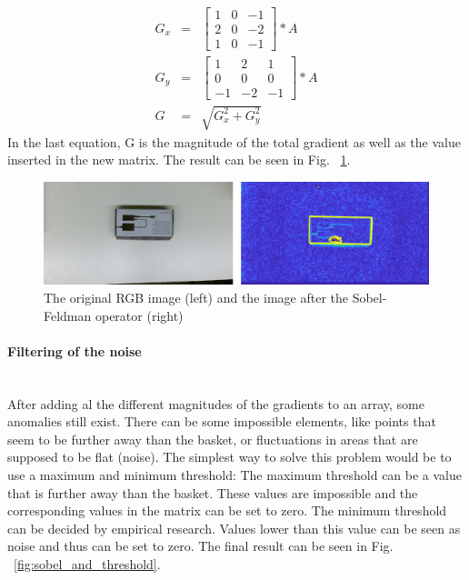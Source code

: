 \documentclass{article}
\begin{document}
\begin{eqnarray*}
G_{x} &=& 
	\begin{bmatrix}
		1&0&-1\\
		2&0&-2\\
		1&0&-1
	\end{bmatrix}
	*A \\
G_{y} &=& 
	\begin{bmatrix}
		1&2&1\\
		0&0&0\\
		-1&-2&-1
	\end{bmatrix}
	*A\\
G &=& \sqrt{G_{x}^2+G_{y}^2}
\end{eqnarray*}
In the last equation, G is the magnitude of the total gradient as well as the value inserted in the new matrix.
The result can be seen in Fig. ~\ref{fig:original_and_sobel}.
\begin{figure}[h]
	\center
  \includegraphics[width=1\linewidth]{original_and_sobel.png}
  \caption{The original RGB image (left) and the image after the Sobel-Feldman operator (right)}
  \label{fig:original_and_sobel}
\end{figure}

\paragraph{Filtering of the noise}\mbox{}\\
After adding al the different magnitudes of the gradients to an array, some anomalies still exist. There can be some impossible elements, like points that seem to be further away than the basket, or fluctuations in areas that are supposed to be flat (noise). The simplest way to solve this problem would be to use a maximum and minimum threshold: The maximum threshold can be a value that is further away than the basket. These values are impossible and the corresponding values in the matrix can be set to zero. The minimum threshold can be decided by empirical research. Values lower than this value can be seen as noise and thus can be set to zero. The final result can be seen in Fig. ~\ref{fig:sobel_and_threshold}.
\end{document}
